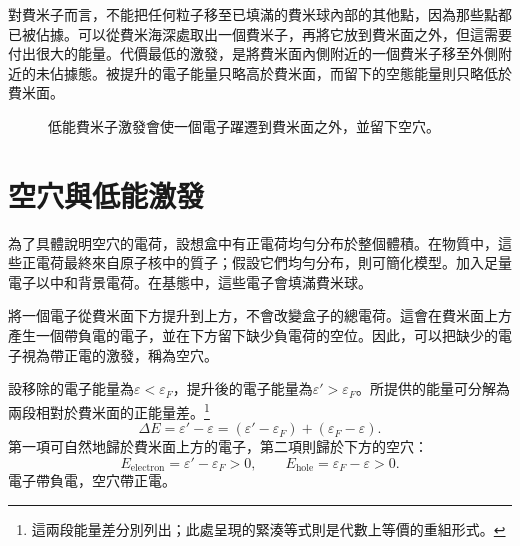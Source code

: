 對費米子而言，不能把任何粒子移至已填滿的費米球內部的其他點，因為那些點都已被佔據。可以從費米海深處取出一個費米子，再將它放到費米面之外，但這需要付出很大的能量。代價最低的激發，是將費米面內側附近的一個費米子移至外側附近的未佔據態。被提升的電子能量只略高於費米面，而留下的空態能量則只略低於費米面。

\begin{figure}
\centering
{}
\caption{低能費米子激發會使一個電子躍遷到費米面之外，並留下空穴。}
\end{figure}

\section{空穴與低能激發}

為了具體說明空穴的電荷，設想盒中有正電荷均勻分布於整個體積。在物質中，這些正電荷最終來自原子核中的質子；假設它們均勻分布，則可簡化模型。加入足量電子以中和背景電荷。在基態中，這些電子會填滿費米球。

將一個電子從費米面下方提升到上方，不會改變盒子的總電荷。這會在費米面上方產生一個帶負電的電子，並在下方留下缺少負電荷的空位。因此，可以把缺少的電子視為帶正電的激發，稱為空穴。

\begin{classroomqa}
\end{classroomqa}

設移除的電子能量為\(\varepsilon<\varepsilon_F\)，提升後的電子能量為\(\varepsilon'>\varepsilon_F\)。所提供的能量可分解為兩段相對於費米面的正能量差。\footnote{這兩段能量差分別列出；此處呈現的緊湊等式則是代數上等價的重組形式。}
\begin{equation}
\Delta E
=\varepsilon'-\varepsilon
=(\varepsilon'-\varepsilon_F)+(\varepsilon_F-\varepsilon).
\end{equation}
第一項可自然地歸於費米面上方的電子，第二項則歸於下方的空穴：
\begin{equation}
E_{\mathrm{electron}}=\varepsilon'-\varepsilon_F>0,
\qquad
E_{\mathrm{hole}}=\varepsilon_F-\varepsilon>0.
\end{equation}
電子帶負電，空穴帶正電。

